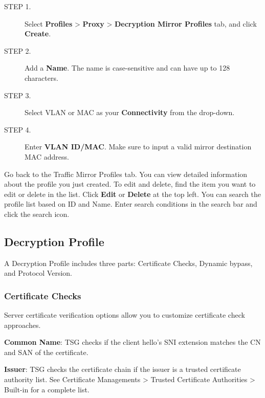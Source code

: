 \begin{description}
    \item[STEP 1.]	Select \textbf{Profiles} > \textbf{Proxy} > \textbf{Decryption Mirror Profiles} tab, and click \textbf{Create}.
    \item[STEP 2.]	Add a \textbf{Name}. The name is case-sensitive and can have up to 128 characters.
    \item[STEP 3.]	Select VLAN or MAC as your \textbf{Connectivity} from the drop-down.
    \item[STEP 4.]	Enter \textbf{VLAN ID/MAC}. Make sure to input a valid mirror destination MAC address. 
\end{description} 
Go back to the Traffic Mirror Profiles tab. You can view detailed information about the profile you just created. 
To edit and delete, find the item you want to edit or delete in the list. Click \textbf{Edit} or \textbf{Delete} at the top left. 
You can search the profile list based on ID and Name. Enter search conditions in the search bar and click the search icon.

\subsection*{\hypertarget{link:Decryption Profile}{Decryption Profile}}
\label{sec:decrypt:profile:decryptionprofile}

A Decryption Profile includes three parts: Certificate Checks, Dynamic bypass, and Protocol Version. 

\subsubsection*{\hypertarget{link:Certificate Checks}{Certificate Checks}}
\label{sec:decrypt:profile:decryptionprofile:check}

Server certificate verification options allow you to customize certificate check approaches.


\textbf{Common Name}: TSG checks if the client hello’s SNI extension matches the CN and SAN of the certificate.


\textbf{Issuer}: TSG checks the certificate chain if the issuer is a trusted certificate authority list. See Certificate Managements > Trusted Certificate Authorities > Built-in for a complete list.


